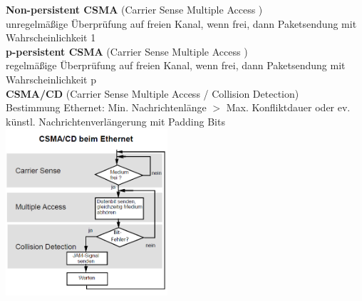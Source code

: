 \documentclass[fs, footer]{latex4ei}
\begin{document}
\begin{multicols*}{4}
{	\textbf{Non-persistent CSMA} (Carrier Sense Multiple Access ) \\
		unregelmäßige Überprüfung auf freien Kanal, wenn frei, dann Paketsendung mit Wahrscheinlichkeit 1 \\
	
	\textbf{p-persistent CSMA} (Carrier Sense Multiple Access )  \\
		regelmäßige Überprüfung auf freien Kanal, wenn frei, dann Paketsendung mit Wahrscheinlichkeit p \\
		
	\textbf{CSMA/CD} (Carrier Sense Multiple Access / Collision Detection) \\
		Bestimmung Ethernet:  Min. Nachrichtenlänge $ > $  Max. Konfliktdauer oder ev. künstl. Nachrichtenverlängerung mit Padding Bits \\

	\includegraphics[width = 6cm]{./img/CSMA_CD.png}

}


\end{multicols*}
\end{document}
